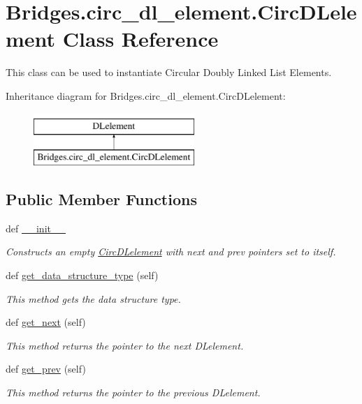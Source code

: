 \hypertarget{class_bridges_1_1circ__dl__element_1_1_circ_d_lelement}{}\section{Bridges.\+circ\+\_\+dl\+\_\+element.\+Circ\+D\+Lelement Class Reference}
\label{class_bridges_1_1circ__dl__element_1_1_circ_d_lelement}


This class can be used to instantiate Circular Doubly Linked List Elements.  


Inheritance diagram for Bridges.\+circ\+\_\+dl\+\_\+element.\+Circ\+D\+Lelement\+:\begin{figure}[H]
\begin{center}
\leavevmode
\includegraphics[height=2.000000cm]{class_bridges_1_1circ__dl__element_1_1_circ_d_lelement}
\end{center}
\end{figure}
\subsection*{Public Member Functions}
\begin{DoxyCompactItemize}
\item 
def \hyperlink{class_bridges_1_1circ__dl__element_1_1_circ_d_lelement_a79664a7230a1c2a55f69ea14f3216512}{\+\_\+\+\_\+init\+\_\+\+\_\+}
\begin{DoxyCompactList}\small\item\em Constructs an empty \hyperlink{class_bridges_1_1circ__dl__element_1_1_circ_d_lelement}{Circ\+D\+Lelement} with next and prev pointers set to itself. \end{DoxyCompactList}\item 
def \hyperlink{class_bridges_1_1circ__dl__element_1_1_circ_d_lelement_a47f182e2b4548acc63021b019ec09dd3}{get\+\_\+data\+\_\+structure\+\_\+type} (self)
\begin{DoxyCompactList}\small\item\em This method gets the data structure type. \end{DoxyCompactList}\item 
def \hyperlink{class_bridges_1_1circ__dl__element_1_1_circ_d_lelement_a5d52715940d44ce54de49948f55d5991}{get\+\_\+next} (self)
\begin{DoxyCompactList}\small\item\em This method returns the pointer to the next D\+Lelement. \end{DoxyCompactList}\item 
def \hyperlink{class_bridges_1_1circ__dl__element_1_1_circ_d_lelement_a1acacbb379727183540f705a48e95500}{get\+\_\+prev} (self)
\begin{DoxyCompactList}\small\item\em This method returns the pointer to the previous D\+Lelement. \end{DoxyCompactList}\end{DoxyCompactItemize}
